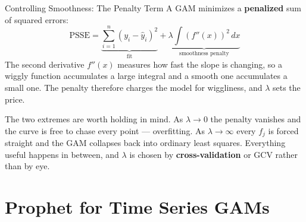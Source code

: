 \documentclass[aspectratio=169, 11pt]{beamer}
\begin{document}
\begin{frame}{Controlling Smoothness: The Penalty Term}
  A GAM minimizes a \textbf{penalized} sum of squared errors:
  \[
    \text{PSSE} = \underbrace{\sum_{i=1}^{n}(y_i - \hat{y}_i)^2}_{\text{fit}} +
                  \underbrace{\lambda \int (f''(x))^2\,dx}_{\text{smoothness penalty}}
  \]
  The second derivative $f''(x)$ measures how fast the slope is changing, so a wiggly
  function accumulates a large integral and a smooth one accumulates a small one. The
  penalty therefore charges the model for wiggliness, and $\lambda$ sets the price.

  \vspace{0.2cm}
  The two extremes are worth holding in mind. As \textbf{$\lambda \to 0$} the penalty
  vanishes and the curve is free to chase every point --- overfitting. As
  \textbf{$\lambda \to \infty$} every $f_j$ is forced straight and the GAM collapses back
  into ordinary least squares. Everything useful happens in between, and $\lambda$ is
  chosen by \textbf{cross-validation} or GCV rather than by eye.

  \vspace{0.1cm}
\end{frame}

\section{Prophet for Time Series GAMs}

\end{document}

